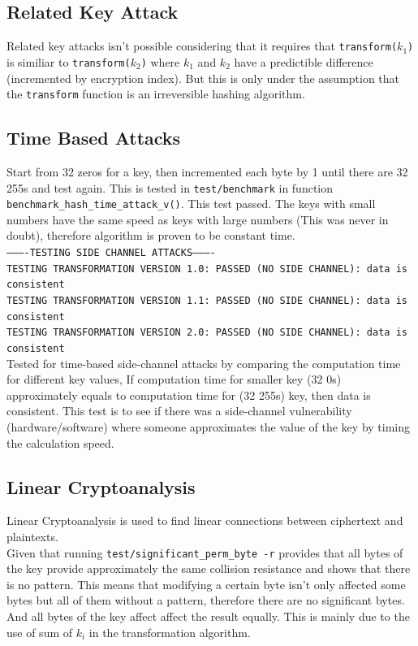 \documentclass[fleqn, a4paper,12pt]{article}
\begin{document}
\subsection{Related Key Attack}

Related key attacks isn't possible considering that it requires that \texttt{transform($k_1$)} is similiar to \texttt{transform($k_2$)} where $k_1$ and $k_2$ have a predictible difference (incremented by encryption index). But this is only under the assumption that the \texttt{transform} function is an irreversible hashing algorithm.

\subsection{Time Based Attacks}

Start from 32 zeros for a key, then incremented each byte by 1 until there are 32 255s and test again. This is tested in \texttt{test/benchmark} in function \texttt{benchmark\_hash\_time\_attack\_v()}. This test passed. The keys with small numbers have the same speed as keys with large numbers (This was never in doubt), therefore algorithm is proven to be constant time.
\\
\texttt{----------TESTING SIDE CHANNEL ATTACKS----------\\
TESTING TRANSFORMATION VERSION 1.0: PASSED (NO SIDE CHANNEL): data is consistent\\
TESTING TRANSFORMATION VERSION 1.1: PASSED (NO SIDE CHANNEL): data is consistent\\
TESTING TRANSFORMATION VERSION 2.0: PASSED (NO SIDE CHANNEL): data is consistent}\\

Tested for time-based side-channel attacks by comparing the computation time for different key values, If computation time for smaller key (32 0s) approximately equals to computation time for (32 255s) key, then data is consistent. This test is to see if there was a side-channel vulnerability (hardware/software) where someone approximates the value of the key by timing the calculation speed.

\subsection{Linear Cryptoanalysis}

Linear Cryptoanalysis is used to find linear connections between ciphertext and plaintexts.
\\
Given that running \texttt{test/significant\_perm\_byte -r} provides that all bytes of the key provide approximately the same collision resistance and shows that there is no pattern. This means that modifying a certain byte isn't only affected some bytes but all of them without a pattern, therefore there are no significant bytes. And all bytes of the key affect affect the result equally. This is mainly due to the use of sum of $k_i$ in the transformation algorithm. 
\end{document}
